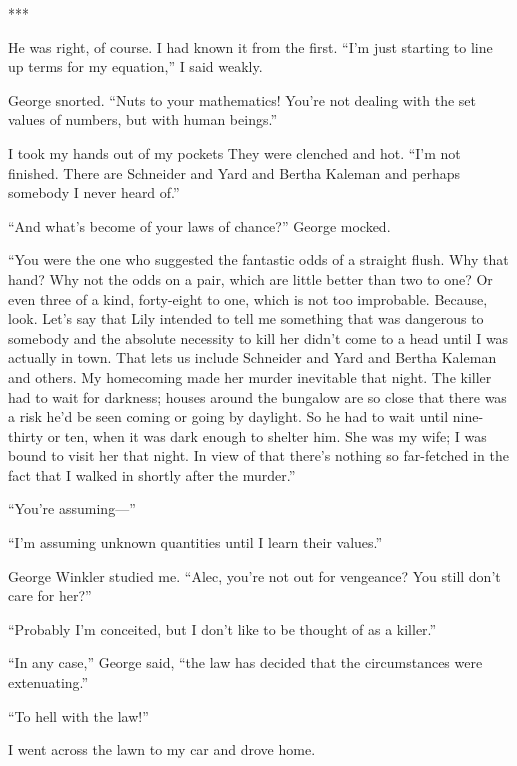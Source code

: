 \documentclass{novel}
\begin{document}
***

He was right, of course. I had known it from the first. “I’m just starting to line up terms for my equation,” I said weakly.

George snorted. “Nuts to your mathematics! You’re not dealing with the set values of numbers, but with human beings.”

I took my hands out of my pockets They were clenched and hot. “I’m not finished. There are Schneider and Yard and Bertha Kaleman and perhaps somebody I never heard of.”

“And what’s become of your laws of chance?” George mocked.

“You were the one who suggested the fantastic odds of a straight flush. Why that hand? Why not the odds on a pair, which are little better than two to one? Or even three of a kind, forty-eight to one, which is not too improbable. Because, look. Let’s say that Lily intended to tell me something that was dangerous to somebody and the absolute necessity to kill her didn’t come to a head until I was actually in town. That lets us include Schneider and Yard and Bertha Kaleman and others. My homecoming made her murder inevitable that night. The killer had to wait for darkness; houses around the bungalow are so close that there was a risk he’d be seen coming or going by daylight. So he had to wait until nine-thirty or ten, when it was dark enough to shelter him. She was my wife; I was bound to visit her that night. In view of that there’s nothing so far-fetched in the fact that I walked in shortly after the murder.”

“You’re assuming—”

“I’m assuming unknown quantities until I learn their values.”

George Winkler studied me. “Alec, you’re not out for vengeance? You still don’t care for her?”

“Probably I’m conceited, but I don’t like to be thought of as a killer.”

“In any case,” George said, “the law has decided that the circumstances were extenuating.”

“To hell with the law!”

I went across the lawn to my car and drove home.

\vspace{2\nbs}
\clearpage
\thispagestyle{empty}


\begin{ChapterStart}
\vspace{3\nbs}
\end{ChapterStart}
\end{document}
